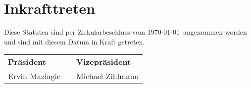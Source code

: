 \section{Inkrafttreten}

Diese Statuten sind per Zirkularbeschluss vom \today~angenommen worden und
sind mit diesem Datum in Kraft getreten.\newline\newline

\begin{tabular}{l r l}
\indent \textbf{Präsident} & 
    \indent \indent \indent \indent \indent \indent &
        \textbf{Vizepräsident} \\
\indent Ervin Mazlagic     & 
    \indent \indent \indent \indent \indent \indent &
        Michael Zihlmann \\
\end{tabular}
